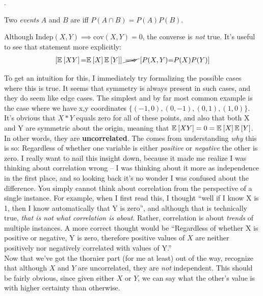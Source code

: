 \documentclass[11pt]{article}
\begin{document}
\myspace
\p {}. 
\begin{compactitem}
	\item Two \textit{events} $A$ and $B$ are  iff $P(A \cap B) = P(A)P(B)$.
	
	\item Although $\text{Indep}(X, Y) \implies \text{cov}(X, Y){=}0$, the converse is \textit{not} true. It's useful to see that statement more explicitly:
	\begin{align}
		\left[ \mathbb{E}_{}\left[XY\right] {=} \mathbb{E}_{}\left[X\right]\mathbb{E}_{}\left[Y\right]  \right]
		\cancel{\implies}
		\left[  P(X, Y) {=} P(X)P(Y) \right] 
	\end{align}
	\begin{example}
		To get an intuition for this, I immediately try formalizing the possible cases where this is true. It seems that symmetry is always present in such cases, and they do seem like edge cases. The simplest and by far most common example is the case where we have x,y coordinates $\{(-1, 0), (0, -1), (0, 1), (1, 0)\}$. \\

		It's obvious that $X * Y$ equals zero for all of these points, and also that both X and Y are symmetric about the origin, meaning that $\mathbb{E}_{}\left[XY\right]=0=\mathbb{E}_{}\left[X\right]\mathbb{E}_{}\left[Y\right]$. In other words, they are \textbf{uncorrelated}. The  comes from understanding \textit{why} this is so: Regardless of whether one variable is either \textit{positive} or \textit{negative} the other is zero. I really want to nail this insight down, because it made me realize I was thinking about correlation wrong -- I was thinking about it more as independence in the first place, and so looking back it's no wonder I was confused about the difference. You simply cannot think about correlation from the perspective of a single instance. For example, when I first read this, I thought ``well if I know X is 1, then I know automatically that Y is zero'', and although that is technically true, \textit{that is not what correlation is about}. Rather, correlation is about \textit{trends} of multiple instances. A more correct thought would be ``Regardless of whether X is positive or negative, Y is zero, therefore positive values of $X$ are neither positively nor negatively correlated with values of Y.''\\
		
		Now that we've got the thornier part (for me at least) out of the way, recognize that although $X$ and $Y$ are uncorrelated, they are \textit{not} independent. This should be fairly obvious, since given either $X$ or $Y$, we can say what the other's value is with higher certainty than otherwise. 
	\end{example}
\end{compactitem}
\end{document}
